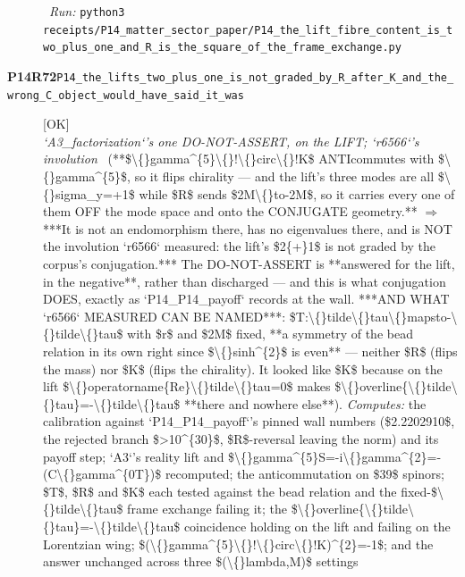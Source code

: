 \begin{description}
\ \emph{Run:} \texttt{python3 receipts/P14\_matter\_sector\_paper/P14\_the\_lift\_fibre\_content\_is\_two\_plus\_one\_and\_R\_is\_the\_square\_of\_the\_frame\_exchange.py}
\item[\rcptlabel{P14_the_lifts_two_plus_one_is_not_graded_by_R_after_K_and_the_wrong_C_object_would_have_said_it_was}{P14R72}\textbf{P14R72}\quad\texttt{P14\_the\_lifts\_two\_plus\_one\_is\_not\_graded\_by\_R\_after\_K\_and\_the\_wrong\_C\_object\_would\_have\_said\_it\_was}]\hfill\textsf{[OK]}\\
\textit{`A3\_factorization`'s one DO-NOT-ASSERT, on the LIFT; `r6566`'s involution} \ (**\$\textbackslash\{\}gamma\textasciicircum{}\{5\}\textbackslash\{\}!\textbackslash\{\}circ\textbackslash\{\}!K\$ ANTIcommutes with \$\textbackslash\{\}gamma\textasciicircum{}\{5\}\$, so it flips chirality --- and the lift's three modes are all \$\textbackslash\{\}sigma\_y=+1\$ while \$R\$ sends \$2M\textbackslash\{\}to-2M\$, so it carries every one of them OFF the mode space and onto the CONJUGATE geometry.** \ensuremath{\Rightarrow} ***It is not an endomorphism there, has no eigenvalues there, and is NOT the involution `r6566` measured: the lift's \$2\{+\}1\$ is not graded by the corpus's conjugation.*** The DO-NOT-ASSERT is **answered for the lift, in the negative**, rather than discharged --- and this is what conjugation DOES, exactly as `P14\_P14\_payoff` records at the wall.  ***AND WHAT `r6566` MEASURED CAN BE NAMED***: \$T:\textbackslash\{\}tilde\textbackslash\{\}tau\textbackslash\{\}mapsto-\textbackslash\{\}tilde\textbackslash\{\}tau\$ with \$r\$ and \$2M\$ fixed, **a symmetry of the bead relation in its own right since \$\textbackslash\{\}sinh\textasciicircum{}\{2\}\$ is even** --- neither \$R\$ (flips the mass) nor \$K\$ (flips the chirality). It looked like \$K\$ because on the lift \$\textbackslash\{\}operatorname\{Re\}\textbackslash\{\}tilde\textbackslash\{\}tau=0\$ makes \$\textbackslash\{\}overline\{\textbackslash\{\}tilde\textbackslash\{\}tau\}=-\textbackslash\{\}tilde\textbackslash\{\}tau\$ **there and nowhere else**). 
\emph{Computes:} the calibration against `P14\_P14\_payoff`'s pinned wall numbers (\$2.2202910\$, the rejected branch \$>10\textasciicircum{}\{30\}\$, \$R\$-reversal leaving the norm) and its payoff step; `A3`'s reality lift and \$\textbackslash\{\}gamma\textasciicircum{}\{5\}S=-i\textbackslash\{\}gamma\textasciicircum{}\{2\}=-(C\textbackslash\{\}gamma\textasciicircum{}\{0T\})\$ recomputed; the anticommutation on \$39\$ spinors; \$T\$, \$R\$ and \$K\$ each tested against the bead relation and the fixed-\$\textbackslash\{\}tilde\textbackslash\{\}tau\$ frame exchange failing it; the \$\textbackslash\{\}overline\{\textbackslash\{\}tilde\textbackslash\{\}tau\}=-\textbackslash\{\}tilde\textbackslash\{\}tau\$ coincidence holding on the lift and failing on the Lorentzian wing; \$(\textbackslash\{\}gamma\textasciicircum{}\{5\}\textbackslash\{\}!\textbackslash\{\}circ\textbackslash\{\}!K)\textasciicircum{}\{2\}=-1\$; and the answer unchanged across three \$(\textbackslash\{\}lambda,M)\$ settings

\end{description}
